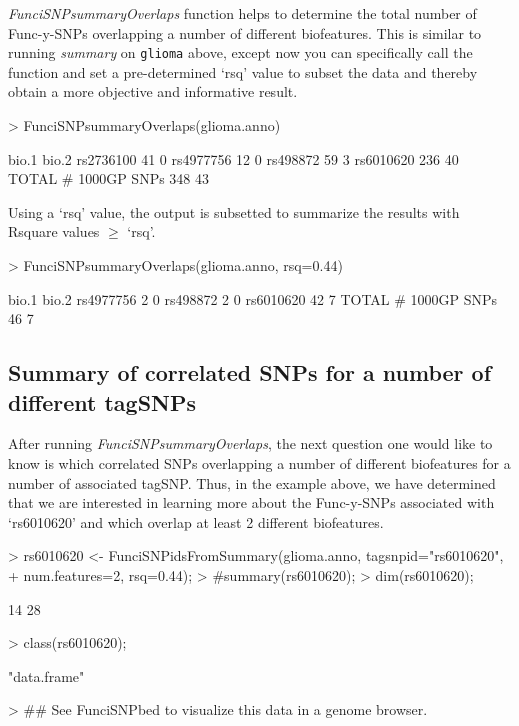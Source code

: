 \documentclass[12pt,fullpage]{article}
\newcommand{\Robject}[1]{{\texttt{#1}}}
\newcommand{\Rmethod}[1]{{\textit{#1}}}
\begin{document}
\Rmethod{FunciSNPsummaryOverlaps} function helps to determine the
total number of Func-y-SNPs overlapping a number of different biofeatures. This
is similar to running \Rmethod{summary} on \Robject{glioma} above, except now
you can specifically call the function and set a pre-determined `rsq' value to
subset the data and thereby obtain a more objective and informative result.

\begin{Schunk}
\begin{Sinput}
> FunciSNPsummaryOverlaps(glioma.anno)
\end{Sinput}
\begin{Soutput}
                    bio.1 bio.2
rs2736100              41     0
rs4977756              12     0
rs498872               59     3
rs6010620             236    40
TOTAL # 1000GP SNPs   348    43
\end{Soutput}
\end{Schunk}

Using a `rsq' value, the output is subsetted to summarize the results with 
Rsquare values $\ge$ `rsq'.

\begin{Schunk}
\begin{Sinput}
> FunciSNPsummaryOverlaps(glioma.anno, rsq=0.44)
\end{Sinput}
\begin{Soutput}
                    bio.1 bio.2
rs4977756               2     0
rs498872                2     0
rs6010620              42     7
TOTAL # 1000GP SNPs    46     7
\end{Soutput}
\end{Schunk}

\subsection{Summary of correlated SNPs for a number of different tagSNPs}

After running \Rmethod{FunciSNPsummaryOverlaps}, the next question one would
like to know is which correlated SNPs overlapping a number of different
biofeatures for a number of associated tagSNP. Thus, in the example above, we
have determined that we are interested in learning more about the Func-y-SNPs
associated with `rs6010620' and which overlap at least 2 different biofeatures.

\begin{Schunk}
\begin{Sinput}
> rs6010620 <- FunciSNPidsFromSummary(glioma.anno, tagsnpid="rs6010620",
+ num.features=2, rsq=0.44);
> #summary(rs6010620);
> dim(rs6010620);
\end{Sinput}
\begin{Soutput}
[1] 14 28
\end{Soutput}
\begin{Sinput}
> class(rs6010620);
\end{Sinput}
\begin{Soutput}
[1] "data.frame"
\end{Soutput}
\begin{Sinput}
> ## See FunciSNPbed to visualize this data in a genome browser.
\end{Sinput}
\end{Schunk}
\end{document}

